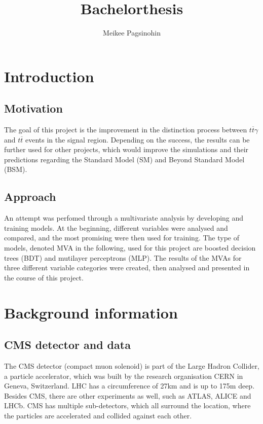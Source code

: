 \documentclass[11pt]{scrartcl}
\title{Bachelorthesis}
\author{Meikee Pagsinohin}
\begin{document}
\tableofcontents
\newpage

\section{Introduction}

	\subsection{Motivation}
		The goal of this project is the improvement in the distinction process between $t\overline{t}\gamma$ and $t\overline{t}$ events in the signal region. Depending on the success, the results can be further used for other projects, which would improve the simulations and their predictions regarding the Standard Model (SM) and Beyond Standard Model (BSM). 

	\subsection{Approach}
	\label{sec:approach}
		An attempt was perfomed through a multivariate analysis by developing and training models. At the beginning, different variables were analysed and compared, and the most promising were then used for training. The type of models, denoted MVA in the following, used for this project are boosted decision trees (BDT) and mutilayer perceptrons (MLP). The results of the MVAs for three different variable categories were created, then analysed and presented in the course of this project.

\section{Background information}
	\subsection{CMS detector and data}
	The CMS detector (compact muon solenoid) is part of the Large Hadron Collider, a particle accelerator, which was built by the research organisation CERN in Geneva, Switzerland. LHC has a circumference of 27km and is up to 175m deep. Besides CMS, there are other experiments as well, such as ATLAS, ALICE and LHCb. CMS has multiple sub-detectors, which all surround the location, where the particles are accelerated and collided against each other.
	
\end{document}
